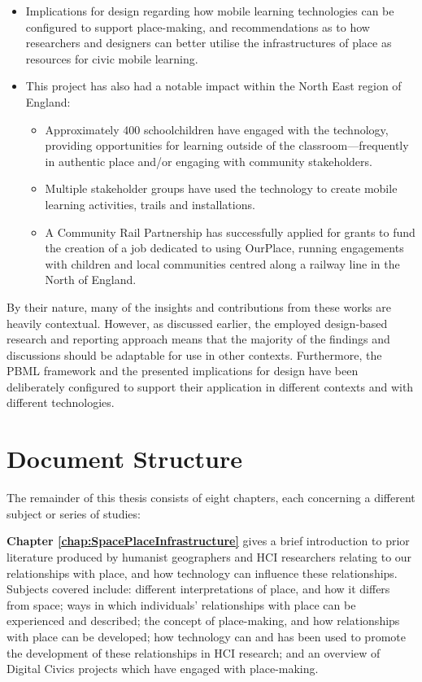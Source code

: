 \begin{itemize}
    \item Implications for design regarding how mobile learning technologies can be configured to support place-making, and recommendations as to how researchers and designers can better utilise the infrastructures of place as resources for civic mobile learning.
    \item This project has also had a notable impact within the North East region of England:
    \begin{itemize}
    \item Approximately 400 schoolchildren have engaged with the technology, providing opportunities for learning outside of the classroom---frequently in authentic place and/or engaging with community stakeholders.
    \item Multiple stakeholder groups have used the technology to create mobile learning activities, trails and installations.
    \item A Community Rail Partnership has successfully applied for grants to fund the creation of a job dedicated to using OurPlace, running engagements with children and local communities centred along a railway line in the North of England.
    \end{itemize}
\end{itemize}

By their nature, many of the insights and contributions from these works are heavily contextual. However, as discussed earlier, the employed design-based research and reporting approach means that the majority of the findings and discussions should be adaptable for use in other contexts. Furthermore, the PBML framework and the presented implications for design have been deliberately configured to support their application in different contexts and with different technologies.

\section{Document Structure}

The remainder of this thesis consists of eight chapters, each concerning a different subject or series of studies: 

\textbf{Chapter \ref{chap:SpacePlaceInfrastructure}} gives a brief introduction to prior literature produced by humanist geographers and HCI researchers relating to our relationships with place, and how technology can influence these relationships. Subjects covered include: different interpretations of place, and how it differs from space; ways in which individuals' relationships with place can be experienced and described; the concept of place-making, and how relationships with place can be developed; how technology can and has been used to promote the development of these relationships in HCI research; and an overview of Digital Civics projects which have engaged with place-making.

